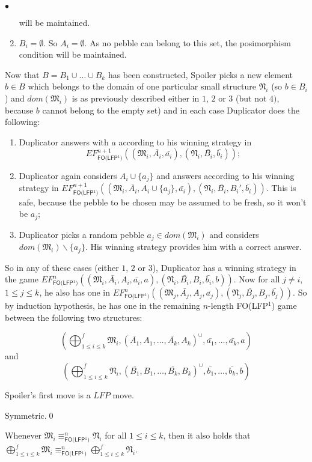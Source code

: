 \documentclass{LMCS}
\newcommand{\frM}{\mathfrak{M}}
\newcommand{\frN}{\mathfrak{N}}
\newcommand{\folfp}{\textsf{FO(LFP$^1$)}\xspace}
\begin{document}
\begin{iteMize}{$\bullet$}
\begin{enumerate}[1)]
will be maintained.
\item     $B_i=\emptyset$. So $A_i=\emptyset$. As no pebble can belong to this set, the
posimorphism condition will be maintained.
\end{enumerate}
Now that $B=B_1 \cup \ldots \cup B_k$ has been constructed,
Spoiler picks a new element $b \in B$ which belongs to the domain
of one particular small structure $\frN_i$ (so $b \in B_i$) and
$dom(\frM_i)$ is as previously described either in $1$, $2$ or
$3$ (but not $4)$, because $b$ cannot belong to the empty set)
and in each case Duplicator does the following:
\begin{enumerate}[1)] 
\item    Duplicator answers with $a$ according to his
winning strategy in
$$EF_\folfp^{n+1}((\frM_i,\bar{A_i},\bar{a_i}),(\frN_i,\bar{B_i},\bar{b_i}));$$
\item  Duplicator again considers $A_i\cup \{a_j\}$ and
answers according to his winning strategy in
$EF_\folfp^{n+1}((\frM_i,\bar{A_i},A_i\cup
\{a_j\},\bar{a_i}),(\frN_i,\bar{B_i},B_i',\bar{b_i}))$. This
is safe, because the pebble to be chosen may be assumed to be fresh, so it
won't be $a_j$;
\item   Duplicator picks
a random pebble $a_j\in dom(\frM_i)$ and considers
$dom(\frM_i)\backslash \{a_j\}$. His winning strategy provides him
with a correct answer.
\end{enumerate}
So in any of these cases (either $1$, $2$ or $3$), Duplicator has a
winning strategy in the game
$EF_\folfp^n((\frM_i,\bar{A_i},A_i,\bar{a_i},a),(\frN_i,\bar{B_i},B_i,\bar{b_i},b))$.
Now for all $j\neq i$, $1 \leq j \leq k$, he also has one in
$EF_\folfp^n((\frM_j,\bar{A_j},A_j,\bar{a_j}),(\frN_j,\bar{B_j},B_j,\bar{b_j}))$.
So by induction hypothesis, he has one in the remaining $n$-length \folfp
game between the following two structures:

$$(\bigoplus_{1\leq i\leq k}^f \frM_i,
(\bar{A_1},A_1,\ldots,\bar{A_k},A_k)^\cup,\bar{a_1},\ldots,\bar{a_k},a)$$
and
$$(\bigoplus_{1\leq i\leq k}^f
\frN_i,(\bar{B_1},B_1,\ldots,\bar{B_k},B_k)^\cup,
\bar{b_1},\ldots,\bar{b_k},b)$$
\item   Spoiler's first move is a $LFP$ move.

Symmetric.\qed
\end{iteMize}


\begin{cor}
Whenever $\frM_i\equiv_\folfp^n\frN_i$ for all $1 \leq i \leq k$,
then it also holds that $\bigoplus_{1\leq i\leq k}^f
\frM_i\equiv_\folfp^n \bigoplus_{1\leq i\leq k}^f
\frN_i$.\label{folfpfusion}
\end{cor}
\end{document}
